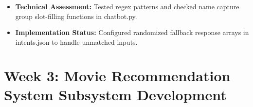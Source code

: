 \documentclass[11pt,a4paper]{article}
\begin{document}
\begin{tcolorbox}[colback=gray!5!white,colframe=gray!60!black,title=Weekly Review (Week 2)]
    \begin{itemize}
        \item \textbf{Technical Assessment:} Tested regex patterns and checked name capture group slot-filling functions in chatbot.py.
        \item \textbf{Implementation Status:} Configured randomized fallback response arrays in intents.json to handle unmatched inputs.
    \end{itemize}
\end{tcolorbox}

\newpage

\section*{Week 3: Movie Recommendation System Subsystem Development}
\end{document}
